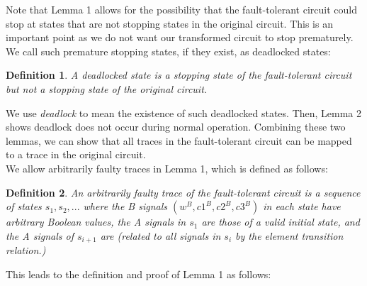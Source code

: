 \documentclass[12pt]{report}
\newtheorem*{definition}{Definition}
\begin{document}
Note that Lemma 1 allows for the possibility that the fault-tolerant circuit could stop at states that are not stopping states in the original circuit.  This is an important point as we do not want our transformed circuit to stop prematurely.  We call such premature stopping states, if they exist, as deadlocked states:
\begin{definition}A {\em deadlocked state} is a stopping state of the fault-tolerant circuit but not a stopping state of the original circuit.\end{definition}
We use {\em deadlock} to mean the existence of such deadlocked states.  
Then, Lemma 2 shows deadlock does not occur during normal operation.  Combining these two lemmas, we can show that all traces in the fault-tolerant circuit can be mapped to a trace in the original circuit.\\

We allow arbitrarily faulty traces in Lemma 1, which is defined as follows:
\begin{definition}An {\em arbitrarily faulty trace} of the fault-tolerant circuit is a sequence of states $s_1, s_2, ...$ where the B signals $(w^B, c1^B, c2^B, c3^B)$ in each state have arbitrary Boolean values, the A signals in $s_1$ are those of a valid initial state, and the A signals of $s_{i+1}$ are (related to all signals in $s_i$ by the element transition relation.)
\end{definition}

This leads to the definition and proof of Lemma 1 as follows:
\end{document}

